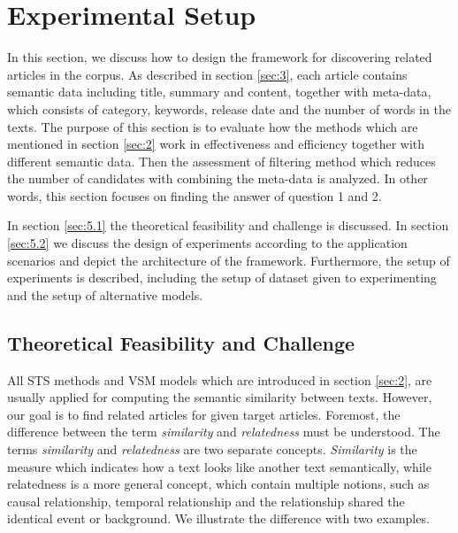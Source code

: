 \section{Experimental Setup}
\label{sec:5}
In this section, we discuss how to design the framework for discovering related articles in the corpus. As described in section \ref{sec:3}, each article contains semantic data including title, summary and content, together with meta-data, which consists of category, keywords, release date and the number of words in the texts. The purpose of this section is to evaluate how the methods which are mentioned in section \ref{sec:2} work in effectiveness and efficiency together with different semantic data. Then the assessment of filtering method which reduces the number of candidates with combining the meta-data is analyzed. In other words, this section focuses on finding the answer of question 1 and 2.

In section \ref{sec:5.1} the theoretical feasibility and challenge is discussed. In section \ref{sec:5.2} we discuss the design of experiments according to the application scenarios and depict the architecture of the framework. Furthermore, the setup of experiments is described, including the setup of dataset given to experimenting and the setup of alternative models. 

\subsection{Theoretical Feasibility and Challenge}

All STS methods and VSM models which are introduced in section \ref{sec:2}, are usually applied for computing the semantic similarity between texts. However, our goal is to find related articles for given target articles. Foremost, the difference between the term \textit{similarity} and \textit{relatedness} must be understood. The terms \textit{similarity} and \textit{relatedness} are two separate concepts\cite{pedersen2007measures}. \textit{Similarity} is the measure which indicates how a text looks like another text semantically, while relatedness is a more general concept, which contain multiple notions, such as causal relationship, temporal relationship and the relationship shared the identical event or background. We illustrate the difference with two examples. 

